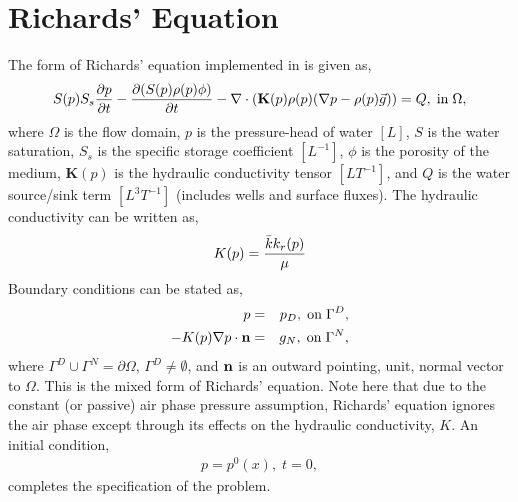 \section{Richards' Equation}
\label{Richards' Equation}

The form of Richards' equation implemented in \parflow{} is given as,
\begin{eqnarray}
S(p)S_s\frac{\partial p}{\partial t} -
\frac{\partial (S(p)\rho(p)\phi)}{\partial t}
- \nabla \cdot (\textbf{K}(p)\rho(p)(\nabla p - \rho(p) {\vec g})) = Q, \;  {\rm in} \; \Omega,
\label{eq:richard}
\end{eqnarray}
where $\Omega$ is the flow domain, $p$ is the pressure-head of water $[L]$, $S$ is the water
saturation, $S_s$ is the specific storage coefficient $[L^{-1}]$, $\phi$ is the porosity of the medium, $\textbf{K}(p)$ is the hydraulic
conductivity tensor $[LT^{-1}]$, and $Q$ is the water source/sink term $[L^{3}T^{-1}]$ (includes wells and surface fluxes).
The hydraulic conductivity can be written as,
\begin{eqnarray}
K(p) =  \frac{{\bar k} k_r(p)}{\mu}
\end{eqnarray}
Boundary conditions can be stated as,
\begin{eqnarray}
p & = & p_D, \; {\rm on} \; \Gamma^D, \label{eq:bcd} \\
-K(p)\nabla p \cdot {\bf n} & = &
g_N, \; {\rm on} \; \Gamma^N, \label{eq:bcn}
\end{eqnarray}
where $\Gamma^D \cup \Gamma^N = \partial \Omega$, $\Gamma^D \neq \emptyset$,
and ${\bf n}$ is an outward pointing, unit, normal vector to $\Omega$.
This is the mixed form of Richards' equation.
Note here that due to the constant (or passive) air phase pressure assumption,
Richards' equation ignores the air phase except through its
effects on the hydraulic conductivity, $K$.
An initial condition,
\begin{eqnarray}
p = p^0(x), \; t = 0,
\end{eqnarray}
completes the specification of the problem.
